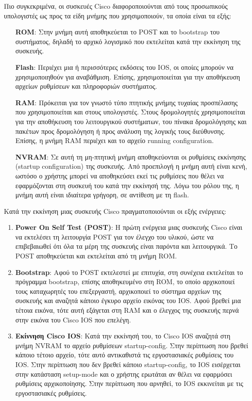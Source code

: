 \documentclass{EdipyLabs} %
\begin{document}
Πιο συγκεκριμένα, οι συσκευές Cisco διαφοροποιούνται από τους προσωπικούς υπολογιστές ως προς τα είδη μνήμης που χρησιμοποιούν, τα οποία είναι τα εξής:
\begin{itemize}
	\item[\textbf{ROM}:] Στην μνήμη αυτή αποθηκεύεται το POST και το bootstrap του συστήματος, δηλαδή το αρχικό λογισμικό που εκτελείται κατά την εκκίνηση της συσκευής.
	\item[\textbf{Flash}:] Περιέχει μια ή περισσότερες εκδόσεις του IOS, οι οποίες μπορούν να χρησιμοποιηθούν για αναβάθμιση. Επίσης, χρησιμοποιείται για την αποθήκευση αρχείων ρυθμίσεων και πληροφοριών συστήματος.
	\item[\textbf{RAM}:] Πρόκειται για τον γνωστό τύπο πτητικής μνήμης τυχαίας προσπέλασης που χρησιμοποιείται και στους υπολογιστές. Στους δρομολογητές χρησιμοποιείται για την αποθήκευση του λειτουργικού συστήματων, του πίνακα δρομολόγησης και πακέτων προς δρομολόγηση ή προς ανάλυση της λογικής τους διεύθυνσης. Επίσης, η μνήμη RAM περιέχει και το αρχείο running configuration.
	\item[\textbf{NVRAM}:] Σε αυτή τη μη-πτητική μνήμη αποθηκεύονται οι ρυθμίσεις εκκίνησης (startup configuration) της συσκευής. Από προεπιλογή η μνήμη αυτή είναι κενή, ωστόσο ο χρήστης μπορεί να αποθηκεύσει εκεί τις ρυθμίσεις που θέλει να εφαρμόζονται στη συσκευή του κατά την εκκίνησή της. Λόγω του ρόλου της, η μνήμη αυτή είναι ιδιαίτερα γρήγορη, σε αντίθεση με τη flash.
\end{itemize}

Κατά την εκκίνηση μιας συσκευής Cisco πραγματοποιούνται οι εξής ενέργειες:
\begin{enumerate}
	\item \textbf{Power On Self Test (POST)}: Η πρώτη ενέργεια μιας συσκευής Cisco είναι να εκτελέσει τη λειτουργία POST για τον έλεγχο του υλικού, ώστε να επιβεβαιωθεί ότι όλα τα μέρη της συσκευής είναι παρόντα και λειτουργικά. Το POST αποθηκεύεται και εκτελείται από τη μνήμη ROM.
	\item \textbf{Bootstrap}: Αφού το POST εκτελεστεί με επιτυχία, στη συνέχεια εκτελείται το πρόγραμμα bootstrap, επίσης αποθηκευμένο στη ROM, το οποίο αρχικοποιεί τους καταχωρητές του επεξεργαστή, αρχικοποιεί το σύστημα αρχείων της συσκευής και αναζητά κάποιο έγκυρο αρχείο εικόνας του IOS. Αφού βρεθεί μια τέτοια εικόνα, τότε αυτή εξάγεται στη RAM και ο έλεγχος της συσκευής περνά στην εικόνα  του Cisco IOS που επελέγη.
	\item \textbf{Εκίννηση Cisco IOS}: Κατά την εκκίνησή του, το Cisco IOS αναζητά στη μνήμη NVRAM το αρχείο ρυθμίσεων startup-config. Στην περίπτωση που βρεθεί κάποιο τέτοιο αρχείο, τότε αυτό αντικαθιστά τις εργοστασιακές ρυθμίσεις του IOS. Στην περίπτωση που δεν βρεθεί κάποιο startup-config, το IOS εισέρχεται στην κατάσταση setup-mode και ο χρήστης ερωτάται αν θέλει να εφαρμόσει ρυθμίσεις αρχικοποίησης. Στην περίπτωση που αρνηθεί, το IOS εκκινείται με τις εργοστασιακές ρυθμίσεις.
\end{enumerate}
\end{document}
